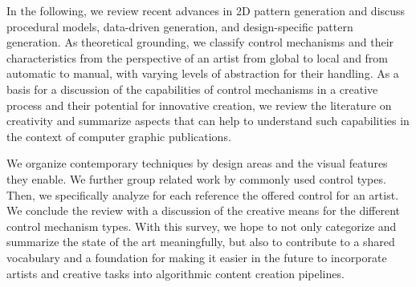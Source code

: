 In the following, we review recent advances in 2D pattern generation and discuss procedural models, data-driven generation, and design-specific pattern generation. As theoretical grounding, we classify control mechanisms and their characteristics from the perspective of an artist from global to local and from automatic to manual, with varying levels of abstraction for their handling. As a basis for a discussion of the capabilities of control mechanisms in a creative process and their potential for innovative creation, we review the literature on creativity and summarize aspects that can help to understand such capabilities in the context of computer graphic publications.

We organize contemporary techniques by design areas and the visual features they enable. We further group related work by commonly used control types. Then, we specifically analyze for each reference the offered control for an artist. 
We conclude the review with a discussion of the creative means for the different control mechanism types. With this survey, we hope to not only categorize and summarize the state of the art meaningfully, but also to contribute to a shared vocabulary and a foundation for making it easier in the future to incorporate artists and creative tasks into algorithmic content creation pipelines.



